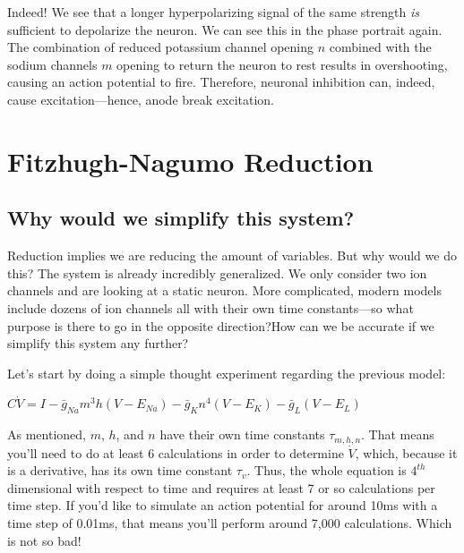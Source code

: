 Indeed! We see that a longer hyperpolarizing signal of the same strength \textit{is} sufficient to depolarize the neuron. We can see this in the phase portrait again. The combination of reduced potassium channel opening $n$ combined with the sodium channels $m$ opening to return the neuron to rest results in overshooting, causing an action potential to fire. Therefore, neuronal inhibition can, indeed, cause excitation---hence, anode break excitation. 



\section{Fitzhugh-Nagumo Reduction}

\subsection{Why would we simplify this system?} Reduction implies we are reducing the amount of variables. But why would we do this? The system is already incredibly generalized. We only consider two ion channels and are looking at a static neuron. More complicated, modern models include dozens of ion channels all with their own time constants---so what purpose is there to go in the opposite direction?How can we be accurate if we simplify this system any further?\newline

Let's start by doing a simple thought experiment regarding the previous model: 

\bigskip

\begin{center}

    $C\dot{V} = I - \bar{g}_{Na}m^3h(V - E_{Na}) - \bar{g}_{K}n^4(V - E_{K}) - \bar{g}_{L}(V - E_{L})$
    
\end{center}

\bigskip

As mentioned, $m$, $h$, and $n$ have their own time constants $\tau_{m,h,n}$. That means you'll need to do at least 6 calculations in order to determine $\dot{V}$, which, because it is a derivative, has its own time constant $\tau_v$. Thus, the whole equation is $4^{th}$ dimensional with respect to time and requires at least 7 or so calculations per time step. If you'd like to simulate an action potential for around 10ms with a time step of 0.01ms, that means you'll perform around 7,000 calculations. Which is not so bad!\newline 

